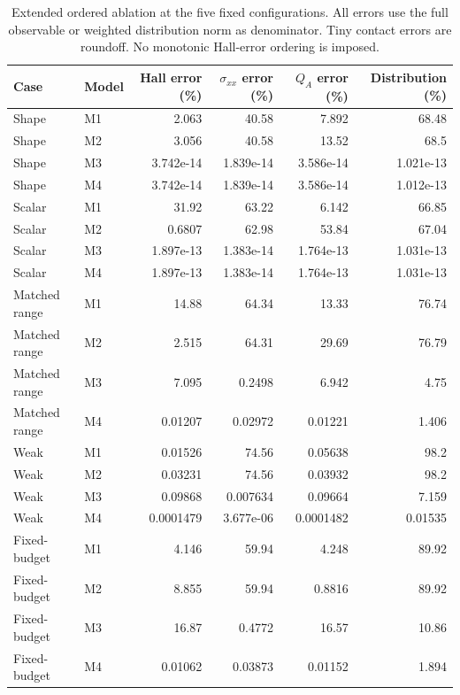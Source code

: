 \begin{table}[ht]\centering\small
\begin{tabular}{llrrrr}\toprule
Case & Model & Hall error (\%) & $\sigma_{xx}$ error (\%) & $Q_A$ error (\%) & Distribution (\%)\\\midrule
Shape & M1 & 2.063 & 40.58 & 7.892 & 68.48\\
Shape & M2 & 3.056 & 40.58 & 13.52 & 68.5\\
Shape & M3 & 3.742e-14 & 1.839e-14 & 3.586e-14 & 1.021e-13\\
Shape & M4 & 3.742e-14 & 1.839e-14 & 3.586e-14 & 1.012e-13\\
Scalar & M1 & 31.92 & 63.22 & 6.142 & 66.85\\
Scalar & M2 & 0.6807 & 62.98 & 53.84 & 67.04\\
Scalar & M3 & 1.897e-13 & 1.383e-14 & 1.764e-13 & 1.031e-13\\
Scalar & M4 & 1.897e-13 & 1.383e-14 & 1.764e-13 & 1.031e-13\\
Matched range & M1 & 14.88 & 64.34 & 13.33 & 76.74\\
Matched range & M2 & 2.515 & 64.31 & 29.69 & 76.79\\
Matched range & M3 & 7.095 & 0.2498 & 6.942 & 4.75\\
Matched range & M4 & 0.01207 & 0.02972 & 0.01221 & 1.406\\
Weak & M1 & 0.01526 & 74.56 & 0.05638 & 98.2\\
Weak & M2 & 0.03231 & 74.56 & 0.03932 & 98.2\\
Weak & M3 & 0.09868 & 0.007634 & 0.09664 & 7.159\\
Weak & M4 & 0.0001479 & 3.677e-06 & 0.0001482 & 0.01535\\
Fixed-budget & M1 & 4.146 & 59.94 & 4.248 & 89.92\\
Fixed-budget & M2 & 8.855 & 59.94 & 0.8816 & 89.92\\
Fixed-budget & M3 & 16.87 & 0.4772 & 16.57 & 10.86\\
Fixed-budget & M4 & 0.01062 & 0.03873 & 0.01152 & 1.894\\
\bottomrule\end{tabular}
\caption{Extended ordered ablation at the five fixed configurations. All errors use the full observable or weighted distribution norm as denominator. Tiny contact errors are roundoff. No monotonic Hall-error ordering is imposed.}\end{table}
